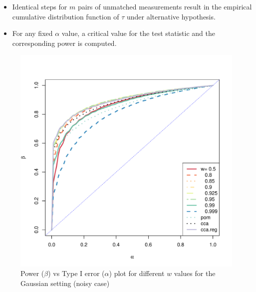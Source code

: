 \documentclass[11pt]{article} %
\begin{document}
\begin{itemize}
\item Identical steps for $m$ pairs of unmatched measurements result in the empirical cumulative distribution  function of $\tau$ under alternative hypothesis.
\item For any fixed $\alpha$ value, a critical value for the test statistic and the corresponding power is computed.
\end{itemize}



\begin{figure}
\includegraphics[scale=0.35]{MVN-FC-Tradeoff-OOS-c0_01.pdf}
\caption{Power ($\beta$) vs Type I error ($\alpha$) plot for different $w$ values for the Gaussian setting (noisy case)}
\label{fig:MVN-c001-power-alpha}
\end{figure}
\end{document}
